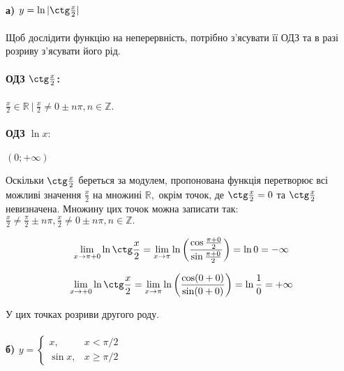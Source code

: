 \documentclass[../rgr1.tex]{subfiles}
\begin{document}

\paragraph{
	а) $y = \ln |\ctg \frac{x}{2}|$
}

\Solution

Щоб дослідити функцію на неперервність, потрібно з'ясувати
її ОДЗ та в разі розриву з'ясувати його рід.

\paragraph{ОДЗ $\ctg \frac{x}{2}$:} $\frac{x}{2} \in \mathbb R~|~
\frac{x}{2} \neq 0 \pm n\pi, n \in \mathbb Z$.
\paragraph{ОДЗ $\ln x:$} $(0; +\infty)$

Оскільки $\ctg \frac{x}{2}$ береться за модулем, пропонована функція перетворює
всі можливі значення $\frac{x}{2}$ на множині $\mathbb R,$ окрім точок, де
$\ctg \frac{x}{2} = 0$ та $\ctg \frac{x}{2}$ невизначена. Множину цих точок можна записати так: $\frac{x}{2} \neq \frac{\pi}{2} \pm n\pi, \frac{x}{2} \neq 0 \pm n\pi, n \in \mathbb Z.$ %


\begin{equation}
	\lim_{x\to\pi+0}\ln\ctg\frac{x}{2} =
	\lim_{x\to{\pi}}{\ln\left(
		\frac{\cos\frac{\pi+0}{2}}
		{\sin\frac{\pi+0}{2}}
	\right)}
	=\ln 0
	=-\infty
\end{equation}

\begin{equation}
	\lim_{x\to+0}\ln\ctg\frac{x}{2} =
	\lim_{x\to{\pi}}{\ln\left(
		\frac{\cos(0+0)}
		{\sin(0+0)}
	\right)}
	=\ln \frac{1}{0}
	=+\infty
\end{equation}

У цих точках розриви другого роду.

\paragraph{
	б) $y =
	\begin{cases}
		x, & x < \pi/2 \\
		\sin x, & x \geq \pi/2
	\end{cases}
	$
}

\Solution
\end{document}
